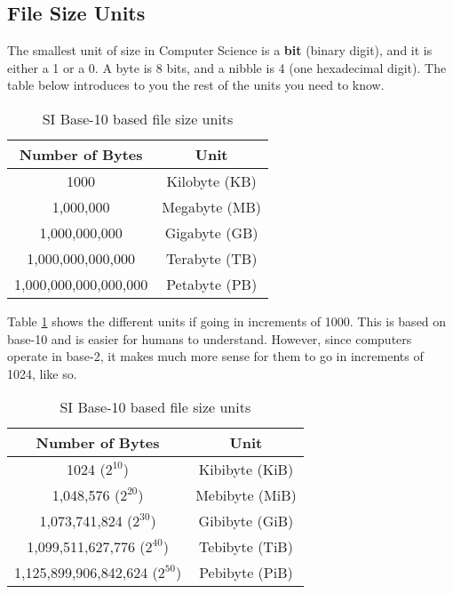 \documentclass[../main.tex]{subfiles}
\begin{document}
\subsection{File Size Units}

The smallest unit of size in Computer Science is a \textbf{bit} (binary digit), and it is either a 1 or a 0. A byte is 8 bits, and a nibble is 4 (one hexadecimal digit). The table below introduces to you the rest of the units you need to know.

\begin{table}[H]
    \centering
    \begin{tabular}{|c|c|}
        \hline
        \textbf{Number of Bytes} & \textbf{Unit}
        \\ \hline
        1000 & Kilobyte (KB)
        \\ \hline
        1,000,000 & Megabyte (MB)
        \\ \hline
        1,000,000,000 & Gigabyte (GB)
        \\ \hline
        1,000,000,000,000 & Terabyte (TB)
        \\ \hline
        1,000,000,000,000,000 & Petabyte (PB)
        \\ \hline
    \end{tabular}
    \caption{SI Base-10 based file size units}
    \label{tab:base10_units}
\end{table}

Table \ref{tab:base10_units} shows the different units if going in increments of 1000. This is based on base-10 and is easier for humans to understand. However, since computers operate in base-2, it makes much more sense for them to go in increments of 1024, like so.

\begin{table}[H]
    \centering
    \begin{tabular}{|c|c|}
        \hline
        \textbf{Number of Bytes} & \textbf{Unit} 
        \\ \hline
        1024 ($2^{10}$) & Kibibyte (KiB)
        \\ \hline
        1,048,576 ($2^{20}$) & Mebibyte (MiB)
        \\ \hline
        1,073,741,824 ($2^{30}$) & Gibibyte (GiB)
        \\ \hline
        1,099,511,627,776 ($2^{40}$) & Tebibyte (TiB)
        \\ \hline
        1,125,899,906,842,624 ($2^{50}$) & Pebibyte (PiB)
        \\ \hline
    \end{tabular}
    \caption{SI Base-10 based file size units}
    \label{tab:computer_units}
\end{table}
\end{document}
